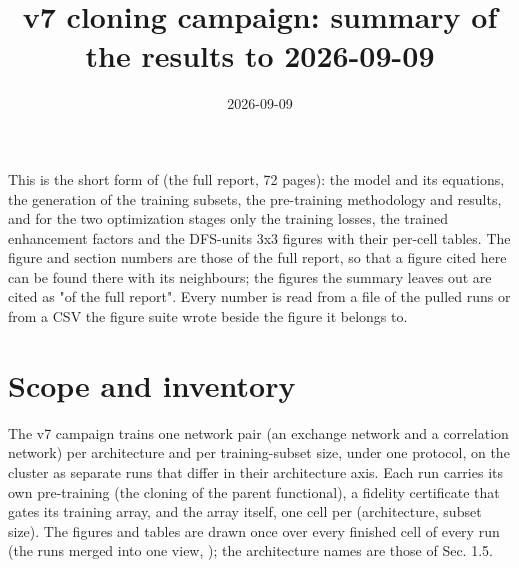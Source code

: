 \documentclass[10pt,a4paper]{article}
\begin{document}
\title{v7 cloning campaign: summary of the results to 2026-09-09}
\author{}\date{2026-09-09}
\maketitle


This is the short form of  (the full report, 72 pages): the model and its equations, the generation of the training subsets, the pre-training methodology and results, and for the two optimization stages only the training losses, the trained enhancement factors and the DFS-units 3x3 figures with their per-cell tables. The figure and section numbers are those of the full report, so that a figure cited here can be found there with its neighbours; the figures the summary leaves out are cited as "of the full report". Every number is read from a file of the pulled runs or from a CSV the figure suite wrote beside the figure it belongs to.

\section*{Scope and inventory}

The v7 campaign trains one network pair (an exchange network and a correlation network) per architecture and per training-subset size, under one protocol, on the cluster as separate runs that differ in their architecture axis. Each run carries its own pre-training (the cloning of the parent functional), a fidelity certificate that gates its training array, and the array itself, one cell per (architecture, subset size). The figures and tables are drawn once over every finished cell of every run (the runs merged into one view, ); the architecture names are those of Sec. 1.5.
\end{document}
